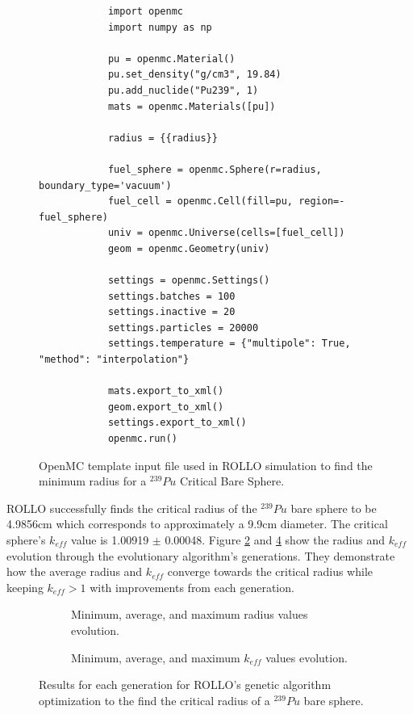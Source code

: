 \begin{figure}[]
    \begin{verbatim}
            import openmc 
            import numpy as np

            pu = openmc.Material()
            pu.set_density("g/cm3", 19.84)
            pu.add_nuclide("Pu239", 1)
            mats = openmc.Materials([pu])
            
            radius = {{radius}}
            
            fuel_sphere = openmc.Sphere(r=radius, boundary_type='vacuum')
            fuel_cell = openmc.Cell(fill=pu, region=-fuel_sphere)
            univ = openmc.Universe(cells=[fuel_cell])
            geom = openmc.Geometry(univ)
            
            settings = openmc.Settings()
            settings.batches = 100
            settings.inactive = 20
            settings.particles = 20000
            settings.temperature = {"multipole": True, "method": "interpolation"}
            
            mats.export_to_xml()
            geom.export_to_xml()
            settings.export_to_xml()
            openmc.run()
    \end{verbatim}
    \caption{OpenMC template input file used in ROLLO simulation to find the 
    minimum radius for a $^{239}Pu$ Critical Bare Sphere.}
    \label{fig:critical_sphere.py}
\end{figure}  

\gls{ROLLO} successfully finds the critical radius of the $^{239}Pu$ bare sphere 
to be 4.9856cm which corresponds to approximately a 9.9cm diameter. 
The critical sphere's $k_{eff}$ value is 1.00919 $\pm$ 0.00048. 
Figure \ref{fig:verification-radius} and \ref{fig:verification-keff} show the 
radius and $k_{eff}$ evolution through the evolutionary algorithm's 
generations. 
They demonstrate how the average radius and $k_{eff}$ converge
towards the critical radius while keeping $k_{eff} > 1$ with improvements from 
each generation.
\begin{figure}[]
    \centering
    \begin{subfigure}{\textwidth}
    \caption{Minimum, average, and maximum radius values evolution.}
    \label{fig:verification-radius}
    \end{subfigure}
    \begin{subfigure}{\textwidth}
        \caption{Minimum, average, and maximum $k_{eff}$ values evolution.}
        \label{fig:verification-keff}
    \end{subfigure}
    \caption{Results for each generation for \gls{ROLLO}'s genetic algorithm optimization 
    to the find the critical radius of a  $^{239}Pu$ bare sphere.}
\end{figure}

